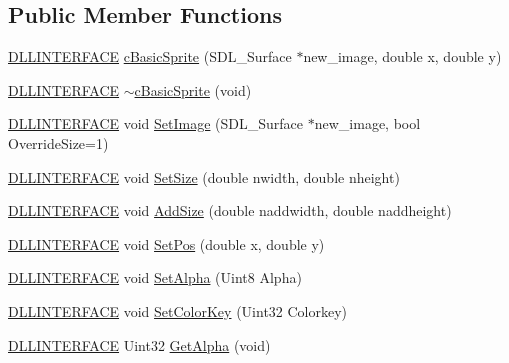 \subsection*{Public Member Functions}
\begin{DoxyCompactItemize}
\item 
\hyperlink{_s_d_l__ep_8h_a38dd54df4631b4daf553096353d7b20b}{D\-L\-L\-I\-N\-T\-E\-R\-F\-A\-C\-E} \hyperlink{classc_basic_sprite_a67287cccee7507470c789feb364555fa}{c\-Basic\-Sprite} (S\-D\-L\-\_\-\-Surface $\ast$new\-\_\-image, double x, double y)
\item 
\hyperlink{_s_d_l__ep_8h_a38dd54df4631b4daf553096353d7b20b}{D\-L\-L\-I\-N\-T\-E\-R\-F\-A\-C\-E} \hyperlink{classc_basic_sprite_a6c513c15c7bcb2651b2576b053154c30}{$\sim$c\-Basic\-Sprite} (void)
\item 
\hyperlink{_s_d_l__ep_8h_a38dd54df4631b4daf553096353d7b20b}{D\-L\-L\-I\-N\-T\-E\-R\-F\-A\-C\-E} void \hyperlink{classc_basic_sprite_a48c328c8b39e0ec871f8f02436e53e41}{Set\-Image} (S\-D\-L\-\_\-\-Surface $\ast$new\-\_\-image, bool Override\-Size=1)
\item 
\hyperlink{_s_d_l__ep_8h_a38dd54df4631b4daf553096353d7b20b}{D\-L\-L\-I\-N\-T\-E\-R\-F\-A\-C\-E} void \hyperlink{classc_basic_sprite_ae17ff9f6cc4d178240cc3d4c79eb0169}{Set\-Size} (double nwidth, double nheight)
\item 
\hyperlink{_s_d_l__ep_8h_a38dd54df4631b4daf553096353d7b20b}{D\-L\-L\-I\-N\-T\-E\-R\-F\-A\-C\-E} void \hyperlink{classc_basic_sprite_ae92714cf9589ae0bc1769491f0440053}{Add\-Size} (double naddwidth, double naddheight)
\item 
\hyperlink{_s_d_l__ep_8h_a38dd54df4631b4daf553096353d7b20b}{D\-L\-L\-I\-N\-T\-E\-R\-F\-A\-C\-E} void \hyperlink{classc_basic_sprite_abab9b223fef9a6875313718719866ccc}{Set\-Pos} (double x, double y)
\item 
\hyperlink{_s_d_l__ep_8h_a38dd54df4631b4daf553096353d7b20b}{D\-L\-L\-I\-N\-T\-E\-R\-F\-A\-C\-E} void \hyperlink{classc_basic_sprite_ab14231b4170c136c10ccc75b910cb93e}{Set\-Alpha} (Uint8 Alpha)
\item 
\hyperlink{_s_d_l__ep_8h_a38dd54df4631b4daf553096353d7b20b}{D\-L\-L\-I\-N\-T\-E\-R\-F\-A\-C\-E} void \hyperlink{classc_basic_sprite_a5e74203883e07a3ad40c8d22191fc70b}{Set\-Color\-Key} (Uint32 Colorkey)
\item 
\hyperlink{_s_d_l__ep_8h_a38dd54df4631b4daf553096353d7b20b}{D\-L\-L\-I\-N\-T\-E\-R\-F\-A\-C\-E} Uint32 \hyperlink{classc_basic_sprite_a236ab4a4fe5c6490a71d0a56b0c73bfb}{Get\-Alpha} (void)
\item 

\end{DoxyCompactItemize}

